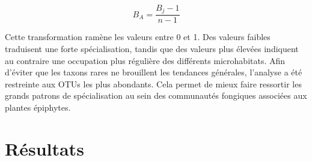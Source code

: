 \documentclass[alpha-refs,twocolumn]{wiley-article}
\begin{document}
\[ B_{A} = \frac{B_j - 1}{n - 1} \]

Cette transformation ramène les valeurs entre 0 et 1. Des valeurs faibles traduisent une forte spécialisation, tandis que des valeurs plus élevées indiquent au contraire une occupation plus régulière des différents microhabitats. Afin d’éviter que les taxons rares ne brouillent les tendances générales, l’analyse a été restreinte aux OTUs les plus abondants. Cela permet de mieux faire ressortir les grands patrons de spécialisation au sein des communautés fongiques associées aux plantes épiphytes.




\section{Résultats}
\end{document}
